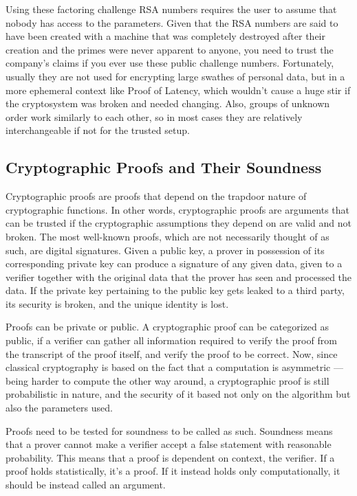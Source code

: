 Using these factoring challenge RSA numbers requires the user to assume that nobody has access to the parameters. Given that the RSA numbers are said to have been created with a machine that was completely destroyed after their creation and the primes were never apparent to anyone, you need to trust the company's claims if you ever use these public challenge numbers. Fortunately, usually they are not used for encrypting large swathes of personal data, but in a more ephemeral context like Proof of Latency, which wouldn't cause a huge stir if the cryptosystem was broken and needed changing. Also, groups of unknown order work similarly to each other, so in most cases they are relatively interchangeable if not for the trusted setup.

\subsection{Cryptographic Proofs and Their Soundness}
Cryptographic proofs are proofs that depend on the trapdoor nature of cryptographic functions. In other words, cryptographic proofs are arguments that can be trusted if the cryptographic assumptions they depend on are valid and not broken. The most well-known proofs, which are not necessarily thought of as such, are digital signatures. Given a public key, a prover in possession of its corresponding private key can produce a signature of any given data, given to a verifier together with the original data that the prover has seen and processed the data. If the private key pertaining to the public key gets leaked to a third party, its security is broken, and the unique identity is lost.

Proofs can be private or public. A cryptographic proof can be categorized as public, if a verifier can gather all information required to verify the proof from the transcript of the proof itself, and verify the proof to be correct. Now, since classical cryptography is based on the fact that a computation is asymmetric --- being harder to compute the other way around, a cryptographic proof is still probabilistic in nature, and the security of it based not only on the algorithm but also the parameters used.

Proofs need to be tested for soundness to be called as such. Soundness means that a prover cannot make a verifier accept a false statement with reasonable probability. This means that a proof is dependent on context, the verifier. If a proof holds statistically, it's a proof. If it instead holds only computationally, it should be instead called an argument.


